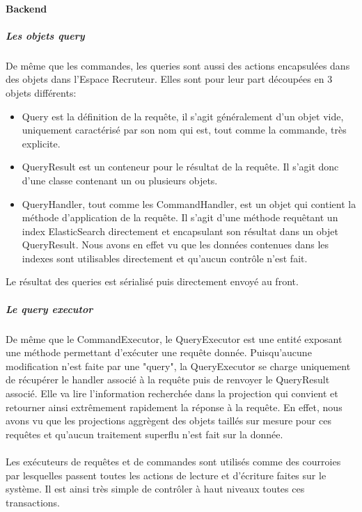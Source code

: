 \paragraph{Backend}
\label{par:Backend}
\subparagraph{Les objets query}
\label{subp:Les objets query}
De même que les commandes, les queries sont aussi des actions encapsulées dans des objets dans l'Espace Recruteur.
Elles sont pour leur part découpées en 3 objets différents:
\begin{itemize}
  \item Query est la définition de la requête, il s'agit généralement d'un objet vide, uniquement caractérisé par son nom qui est, tout comme la commande, très explicite.
  \item QueryResult est un conteneur pour le résultat de la requête.
  Il s'agit donc d'une classe contenant un ou plusieurs objets.
  \item QueryHandler, tout comme les CommandHandler, est un objet qui contient la méthode d'application de la requête.
  Il s'agit d'une méthode requêtant un index ElasticSearch directement et encapsulant son résultat dans un objet QueryResult.
  Nous avons en effet vu que les données contenues dans les indexes sont utilisables directement et qu'aucun contrôle n'est fait.
\end{itemize}
Le résultat des queries est sérialisé puis directement envoyé au front.
\subparagraph{Le query executor}
De même que le CommandExecutor, le QueryExecutor est une entité exposant une méthode permettant d'exécuter une requête donnée.
Puisqu'aucune modification n'est faite par une "query", la QueryExecutor se charge uniquement de récupérer le handler associé à la requête puis de renvoyer le QueryResult associé.
Elle va lire l'information recherchée dans la projection qui convient et retourner ainsi extrêmement rapidement la réponse à la requête.
En effet, nous avons vu que les projections aggrègent des objets taillés sur mesure pour ces requêtes et qu'aucun traitement superflu n'est fait sur la donnée.

\paragraph{}
Les exécuteurs de requêtes et de commandes sont utilisés comme des courroies par lesquelles passent toutes les actions de lecture et d'écriture faites sur le système.
Il est ainsi très simple de contrôler à haut niveaux toutes ces transactions.

